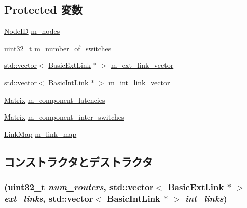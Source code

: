 \subsection*{Protected 変数}
\begin{DoxyCompactItemize}
\item 
\hyperlink{TypeDefines_8hh_a83c14b4ae37e80071f6b3506a6c46151}{NodeID} \hyperlink{classTopology_a7848ab01a6ad135426df6bb144453914}{m\_\-nodes}
\item 
\hyperlink{Type_8hh_a435d1572bf3f880d55459d9805097f62}{uint32\_\-t} \hyperlink{classTopology_a2eba391273b82b4c4ed877d2afc3a32e}{m\_\-number\_\-of\_\-switches}
\item 
\hyperlink{classstd_1_1vector}{std::vector}$<$ \hyperlink{classBasicExtLink}{BasicExtLink} $\ast$ $>$ \hyperlink{classTopology_aa084d35eb02d87885681c2485fe150a3}{m\_\-ext\_\-link\_\-vector}
\item 
\hyperlink{classstd_1_1vector}{std::vector}$<$ \hyperlink{classBasicIntLink}{BasicIntLink} $\ast$ $>$ \hyperlink{classTopology_a96f6560390d8d9fb6326abbaae50fc20}{m\_\-int\_\-link\_\-vector}
\item 
\hyperlink{classstd_1_1vector}{Matrix} \hyperlink{classTopology_a55985d2239fc2d5b912233c00cc4b924}{m\_\-component\_\-latencies}
\item 
\hyperlink{classstd_1_1vector}{Matrix} \hyperlink{classTopology_a5683259c7f9fef54d3a0b105e5b7778a}{m\_\-component\_\-inter\_\-switches}
\item 
\hyperlink{Topology_8hh_a4d8351b0e997e9522e41a5f481d9abfd}{LinkMap} \hyperlink{classTopology_acffefd560ca1c4dd1092c89a15ec0d19}{m\_\-link\_\-map}
\end{DoxyCompactItemize}


\subsection{コンストラクタとデストラクタ}
\hypertarget{classTopology_a0153481ba5c73c2eb2e5267f3dc9ac89}{
\subsubsection[{Topology}]{ ({\bf uint32\_\-t} {\em num\_\-routers}, \/  {\bf std::vector}$<$ {\bf BasicExtLink} $\ast$ $>$ {\em ext\_\-links}, \/  {\bf std::vector}$<$ {\bf BasicIntLink} $\ast$ $>$ {\em int\_\-links})}}
\label{classTopology_a0153481ba5c73c2eb2e5267f3dc9ac89}



